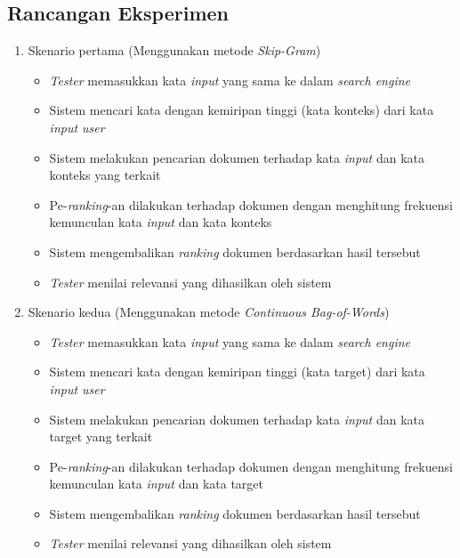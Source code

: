 \documentclass[12pt]{report}
\begin{document}
\subsection{Rancangan Eksperimen}
\renewcommand{\labelitemi}{-}
\begin{enumerate}
\item Skenario pertama (Menggunakan metode \textit{Skip-Gram})
\begin{itemize}
\item \textit{Tester} memasukkan kata \textit{input} yang sama ke dalam \textit{search engine}
\item Sistem mencari kata dengan kemiripan tinggi (kata konteks) dari kata \textit{input user}
\item Sistem melakukan pencarian dokumen terhadap kata \textit{input} dan kata konteks yang terkait
\item Pe-\textit{ranking}-an dilakukan terhadap dokumen dengan menghitung frekuensi kemunculan kata \textit{input} dan kata konteks
\item Sistem mengembalikan \textit{ranking} dokumen berdasarkan hasil tersebut
\item \textit{Tester} menilai relevansi yang dihasilkan oleh sistem
\end{itemize}
\item	Skenario kedua (Menggunakan metode \textit{Continuous Bag-of-Words})
\begin{itemize}
\item \textit{Tester} memasukkan kata \textit{input} yang sama ke dalam \textit{search engine}
\item Sistem mencari kata dengan kemiripan tinggi (kata target) dari kata \textit{input user}
\item Sistem melakukan pencarian dokumen terhadap kata \textit{input} dan kata target yang terkait
\item Pe-\textit{ranking}-an dilakukan terhadap dokumen dengan menghitung frekuensi kemunculan kata \textit{input} dan kata target
\item Sistem mengembalikan \textit{ranking} dokumen berdasarkan hasil tersebut
\item \textit{Tester} menilai relevansi yang dihasilkan oleh sistem
\end{itemize}


\end{enumerate}
\end{document}
